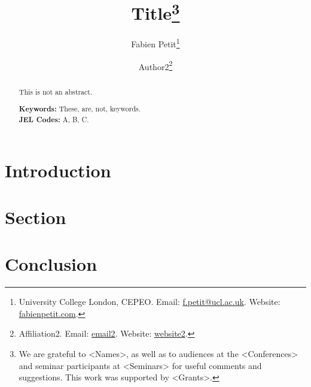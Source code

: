 \documentclass[12pt]{article}
\begin{document}
\title{Title\thanks{
We are grateful to <Names>, as well as to audiences at the <Conferences> and seminar participants at <Seminars> for useful comments and suggestions. 
This work was supported by <Grants>.
}}
\author{Fabien Petit\thanks{University College London, CEPEO. Email: \href{mailto:f.petit@ucl.ac.uk}{f.petit@ucl.ac.uk}. Website: \href{www.fabienpetit.com}{fabienpetit.com}.}
\and
Author2\thanks{Affiliation2. Email: \href{mailto:email2}{email2}. Website: \href{website1}{website2}.}}

\begin{titlepage}
\maketitle

\begin{abstract}
\noindent This is not an abstract.

\vspace{1em}
\noindent\textbf{Keywords:} These, are, not, keywords.\\
\noindent\textbf{JEL Codes:} A, B, C.
\end{abstract}

\setcounter{page}{0}
\thispagestyle{empty}
\end{titlepage}

\pagebreak

\onehalfspacing %

\section{Introduction}\label{sec:introduction}


\section{Section} \label{sec:section}


\section{Conclusion} \label{sec:conclusion}


% 
\end{document}
